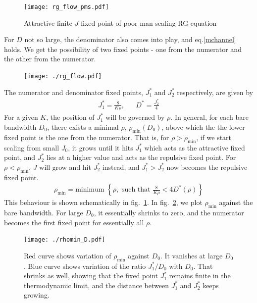 \begin{figure}[htpb]
	\centering
	\texttt{[image: rg\_flow\_pms.pdf]}
	\caption{Attractive finite \(J\) fixed point of poor man scaling RG equation}
\end{figure}
For \(D\) not so large, the denominator also comes into play, and eq.\ref{mchannel} holds. We get the possibility of two fixed points - one from the numerator and the other from the numerator.
\begin{figure}[htpb]
	\centering
	\texttt{[image: ./rg\_flow.pdf]}
	\caption{}
	\label{rg_flow_general}
\end{figure}

The numerator and denominator fixed points, \(J_1^*\) and \(J_2^*\) respectively, are given by
\begin{equation}\begin{aligned}
	J_1^* = \frac{8}{K \rho}, && D^* = \frac{J_2^*}{4}
\end{aligned}\end{equation}
For a given \(K\), the position of \(J_1^*\) will be governed by \(\rho\). In general, for each bare bandwidth \(D_0\), there exists a minimal \(\rho\), $\rho_\text{min}(D_0)$, above which the the lower fixed point is the one from the numerator. That is, for \(\rho > \rho_\text{min}\), if we start scaling from small \(J_0\), it grows until it hits \(J_1^*\) which acts as the attractive fixed point, and \(J_2^*\) lies at a higher value and acts as the repulsive fixed point. For \(\rho < \rho_\text{min}\), \(J\) will grow and hit \(J_2^*\) instead, and \(J_1^* > J_2^*\) now becomes the repulsive fixed point.
\begin{equation}\begin{aligned}
	\rho_\text{min} = \text{minimum }\left\{\rho, \text{ such that } \frac{8}{K \rho} < 4 D^*(\rho)\right\}
\end{aligned}\end{equation}
This behaviour is shown schematically in fig.~\ref{rg_flow_general}. 
In fig.~\ref{rhomin_vs_D}, we plot \(\rho_\text{min}\) against the bare bandwidth. For large \(D_0\), it essentially shrinks to zero, and the numerator becomes the first fixed point for essentially all \(\rho\).
\begin{figure}[htpb]
	\centering
	\texttt{[image: ./rhomin\_D.pdf]}
	\caption{Red curve shows variation of \(\rho_\text{min}\) against \(D_0\). It vanishes at large \(D_0\). Blue curve shows variation of the ratio \(J_1^* / D_0\) with \(D_0\). That shrinks as well, showing that the fixed point \(J_1^*\) remains finite in the thermodynamic limit, and the distance between \(J_1^*\) and \(J_2^*\) keeps growing.}
	\label{rhomin_vs_D}
\end{figure}

